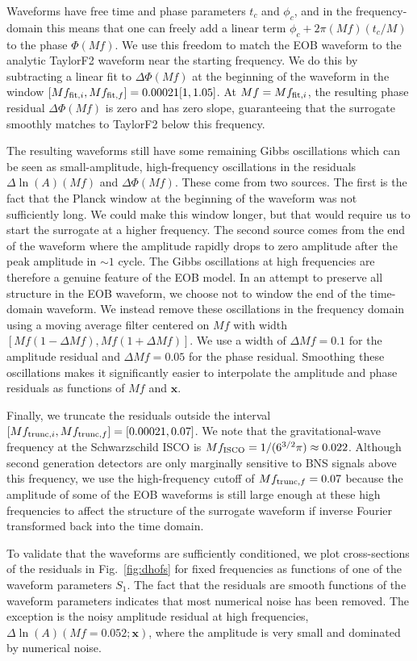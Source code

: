 \documentclass[prd,aps,letter,twocolumn,floatfix,notitlepage,nofootinbib]{revtex4-1}
\def\bx{\mathbf{x}}
\begin{document}
Waveforms have free time and phase parameters $t_c$ and $\phi_c$, and in the frequency-domain this means that one can freely add a linear term $\phi_c + 2\pi (Mf) (t_c/M)$ to the phase $\Phi(Mf)$. We use this freedom to match the EOB waveform to the analytic TaylorF2 waveform near the starting frequency. We do this by subtracting a linear fit to $\Delta\Phi(Mf)$ at the beginning of the waveform in the window $[Mf_{{\rm fit}, i}, Mf_{{\rm fit}, f}] = 0.00021[1, 1.05]$. At $Mf=Mf_{{\rm fit}, i}$, the resulting phase residual $\Delta\Phi(Mf)$ is zero and has zero slope, guaranteeing that the surrogate smoothly matches to TaylorF2 below this frequency.

The resulting waveforms still have some remaining Gibbs oscillations which can be seen as small-amplitude, high-frequency oscillations in the residuals $\Delta\ln(A)(Mf)$ and $\Delta\Phi(Mf)$. These come from two sources. The first is the fact that the Planck window at the beginning of the waveform was not sufficiently long. We could make this window longer, but that would require us to start the surrogate at a higher frequency. The second source comes from the end of the waveform where the amplitude rapidly drops to zero amplitude after the peak amplitude in $\sim 1$ cycle. The Gibbs oscillations at high frequencies are therefore a genuine feature of the EOB model. In an attempt to preserve all structure in the EOB waveform, we choose not to window the end of the time-domain waveform. We instead remove these oscillations in the frequency domain using a moving average filter centered on $Mf$ with width $[Mf(1-\Delta Mf), Mf(1+\Delta Mf)]$. We use a width of $\Delta Mf=0.1$ for the amplitude residual and $\Delta Mf=0.05$ for the phase residual. Smoothing these oscillations makes it significantly easier to interpolate the amplitude and phase residuals as functions of $Mf$ and $\bx$.

Finally, we truncate the residuals outside the interval $[Mf_{{\rm trunc}, i}, Mf_{{\rm trunc}, f}] = [0.00021, 0.07]$. We note that the gravitational-wave frequency at the Schwarzschild ISCO is $Mf_{\rm ISCO} = 1/(6^{3/2}\pi) \approx 0.022$. Although second generation detectors are only marginally sensitive to BNS signals above this frequency, we use the high-frequency cutoff of $Mf_{{\rm trunc}, f}=0.07$ because the amplitude of some of the EOB waveforms is still large enough at these high frequencies to affect the structure of the surrogate waveform if inverse Fourier transformed back into the time domain.

To validate that the waveforms are sufficiently conditioned, we plot cross-sections of the residuals in Fig.~\ref{fig:dhofs} for fixed frequencies as functions of one of the waveform parameters $S_1$. The fact that the residuals are smooth functions of the waveform parameters indicates that most numerical noise has been removed. The exception is the noisy amplitude residual at high frequencies, $\Delta\ln(A)(Mf=0.052; \bx)$, where the amplitude is very small and dominated by numerical noise. 
\end{document}
